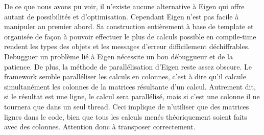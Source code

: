 De ce que nous avons pu voir, il n'existe aucune alternative à Eigen qui offre autant de possibilités et d'optimisation. Cependant Eigen n'est pas facile à manipuler au premier abord. Sa construction entièrement à base de template et organisée de façon à pouvoir effectuer le plus de calculs possible en compile-time rendent les types des objets et les messages d'erreur difficilement déchiffrables. Debugguer un problème lié à Eigen nécessite un bon débuggueur et de la patience. 
De plus, la méthode de parallélisation d'Eigen reste assez obscure. Le framework semble paralléliser les calculs en colonnes, c'est à dire qu'il calcule simultanément les colonnes de la matrices résultante d'un calcul. Autrement dit, si le résultat est une ligne, le calcul sera parallélisé, mais si c'est une colonne il ne tournera que dans un seul thread. Ceci implique de n'utiliser que des matrices lignes dans le code, bien que tous les calculs menés théoriquement soient faits avec des colonnes. Attention donc à transposer correctement.


